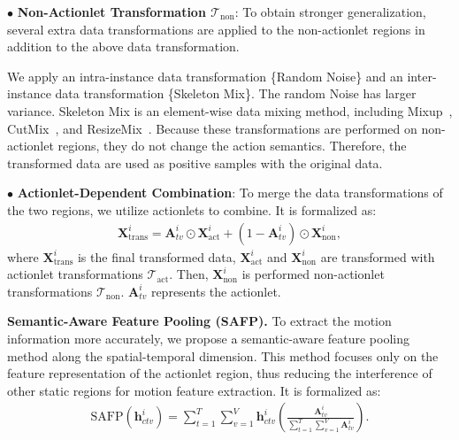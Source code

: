 \documentclass[twocolumn]{article}
\newcommand{\wh}[1]{\textcolor{black}{#1}}
\begin{document}
\vspace{1mm}

$\bullet$ \textbf{Non-Actionlet Transformation $\mathcal{T}_{\text{non}}$}: 
To obtain stronger generalization, several extra data transformations are applied to the non-actionlet regions in addition to the above data transformation.

We apply an intra-instance data transformation \{Random Noise\} and an inter-instance data transformation \{Skeleton Mix\}. The random Noise has larger variance. Skeleton Mix is an element-wise data mixing method, including Mixup~\cite{zhang2017mixup}, CutMix~\cite{yun2019cutmix}, and ResizeMix~\cite{ren2022simple}. Because these transformations are performed on non-actionlet regions, they do not change the action semantics. Therefore, the transformed data are used as positive samples with the original data.











$\bullet$ \textbf{Actionlet-Dependent Combination}:
To merge the data transformations of the two regions, we utilize actionlets to combine.
It is formalized as:
\begin{equation}
    \label{equ:info}
    \begin{aligned}
    \mathbf{X}^i_{\text{trans}} = \mathbf{A}^i_{tv} \odot \mathbf{X}^i_{\text{act}} + (1 - \mathbf{A}^i_{tv}) \odot \mathbf{X}^i_{\text{non}},
    \end{aligned}
\end{equation}
where $\mathbf{X}^i_{\text{trans}}$ is the final transformed data, $\mathbf{X}^i_{\text{act}}$ and $\mathbf{X}^i_{\text{non}}$ are transformed with actionlet transformations $\mathcal{T}_{\text{act}}$. Then, $\mathbf{X}^i_{\text{non}}$ is performed non-actionlet transformations $\mathcal{T}_{\text{non}}$. $\mathbf{A}^i_{tv}$ represents the actionlet.
\vspace{1mm}

\noindent\textbf{Semantic-Aware Feature Pooling (SAFP).} 
\label{sec:safp}
To extract the motion information more accurately, we propose \wh{a} semantic-aware feature pooling method along the spatial-temporal dimension. This method focuses only on the feature representation of the actionlet region, thus reducing the interference of other static regions for motion feature extraction. It is formalized as:
\begin{equation}
    \label{equ:abfp}
    \begin{aligned}
     \text{SAFP}(\mathbf{h}^i_{ctv})= \sum_{t=1}^T \sum_{v=1}^V \mathbf{h}^i_{ctv} \left(\frac{\mathbf{A}^i_{tv}}{\sum_{t=1}^T \sum_{v=1}^V \mathbf{A}^i_{tv}}\right).
    \end{aligned}
\end{equation}
\end{document}

